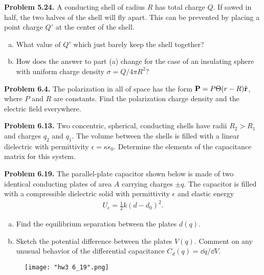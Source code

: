 \documentclass{article}
\begin{document}
\vfill
\hrulefill

\textbf{Problem 5.24.} A conducting shell of radius $R$ has total charge $Q$. If sawed in half, the two halves of the shell will fly apart. This can be prevented by placing a point charge $Q'$ at the center of the shell.
\begin{enumerate}[(a)]
    \item What value of $Q'$ which just barely keep the shell together?
    \item How does the answer to part (a) change for the case of an insulating sphere with uniform charge density $\sigma = Q/4\pi R^2$?
\end{enumerate}



\vfill
\hrulefill

\textbf{Problem 6.4.} The polarization in all of space has the form $\mathbf{P} = P\Theta(r-R)\hat{\vb{r}}$, where $P$ and $R$ are constants. Find the polarization charge density and the electric field everywhere.



\vfill
\hrulefill

\textbf{Problem 6.13.} Two concentric, spherical, conducting shells have radii $R_2>R_1$ and charges $q_2$ and $q_1$. The volume between the shells is filled with a linear dielectric with permittivity $\epsilon = \kappa \epsilon_0$. Determine the elements of the capacitance matrix for this system.



\newpage
\hrulefill

\textbf{Problem 6.19.} The parallel-plate capacitor shown below is made of two identical conducting plates of area $A$ carrying charges $\pm q$. The capacitor is filled with a compressible dielectric solid with permittivity $\epsilon$ and elastic energy
\begin{equation*}
\begin{aligned}
 U_e = \frac{1}{2}k(d-d_0)^2 .
\end{aligned}
\end{equation*}
\begin{enumerate}[(a)]
 \item Find the equilibrium separation between the plates $d(q)$.
 \item Sketch the potential difference between the plates $V(q)$. Comment on any unusual behavior of the differential capacitance $C_d(q) = \dd q/\dd V$.
\end{enumerate}

\begin{figure}[H]
\centering
\texttt{[image: "hw3 6\_19".png]}
\end{figure}
\end{document}
